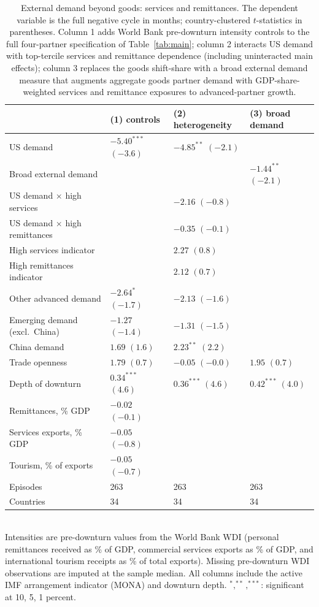 \begin{table}[H]
\centering\small
\caption{External demand beyond goods: services and remittances. The dependent variable is the full negative cycle in months; country-clustered $t$-statistics in parentheses. Column 1 adds World Bank pre-downturn intensity controls to the full four-partner specification of Table~\ref{tab:main}; column 2 interacts US demand with top-tercile services and remittance dependence (including uninteracted main effects); column 3 replaces the goods shift-share with a broad external demand measure that augments aggregate goods partner demand with GDP-share-weighted services and remittance exposures to advanced-partner growth.}
\label{tab:services}
\begin{tabularx}{\textwidth}{@{}lYYY@{}}
\toprule
 & (1) controls & (2) heterogeneity & (3) broad demand \\ \midrule
US demand & $-5.40^{***}$ {\scriptsize$(-3.6)$} & $-4.85^{**}$ {\scriptsize$(-2.1)$} &  \\
Broad external demand &  &  & $-1.44^{**}$ {\scriptsize$(-2.1)$} \\
US demand $\times$ high services &  & $-2.16$ {\scriptsize$(-0.8)$} &  \\
US demand $\times$ high remittances &  & $-0.35$ {\scriptsize$(-0.1)$} &  \\
High services indicator &  & $2.27$ {\scriptsize$(0.8)$} &  \\
High remittances indicator &  & $2.12$ {\scriptsize$(0.7)$} &  \\
Other advanced demand & $-2.64^{*}$ {\scriptsize$(-1.7)$} & $-2.13$ {\scriptsize$(-1.6)$} &  \\
Emerging demand (excl.\ China) & $-1.27$ {\scriptsize$(-1.4)$} & $-1.31$ {\scriptsize$(-1.5)$} &  \\
China demand & $1.69$ {\scriptsize$(1.6)$} & $2.23^{**}$ {\scriptsize$(2.2)$} &  \\
Trade openness & $1.79$ {\scriptsize$(0.7)$} & $-0.05$ {\scriptsize$(-0.0)$} & $1.95$ {\scriptsize$(0.7)$} \\
Depth of downturn & $0.34^{***}$ {\scriptsize$(4.6)$} & $0.36^{***}$ {\scriptsize$(4.6)$} & $0.42^{***}$ {\scriptsize$(4.0)$} \\
Remittances, \% GDP & $-0.02$ {\scriptsize$(-0.1)$} &  &  \\
Services exports, \% GDP & $-0.05$ {\scriptsize$(-0.8)$} &  &  \\
Tourism, \% of exports & $-0.05$ {\scriptsize$(-0.7)$} &  &  \\
\midrule
Episodes & 263 & 263 & 263 \\
Countries & 34 & 34 & 34 \\
\bottomrule
\end{tabularx}
\\[2pt]\footnotesize{Intensities are pre-downturn values from the World Bank WDI (personal remittances received as \% of GDP, commercial services exports as \% of GDP, and international tourism receipts as \% of total exports). Missing pre-downturn WDI observations are imputed at the sample median. All columns include the active IMF arrangement indicator (MONA) and downturn depth. $^{*},^{**},^{***}$: significant at 10, 5, 1 percent.}
\end{table}
